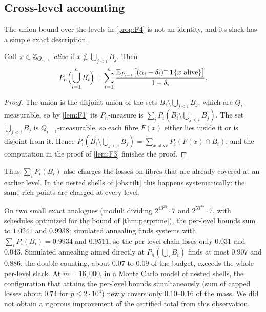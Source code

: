 \subsection{Cross-level accounting}

The union bound over the levels in \cref{prop:F4} is not an identity, and its slack has a simple exact description.

\begin{proposition}\label{prop:live}
Call $x\in\mathbb{Z}_{Q_{i-1}}$ \emph{alive} if $x\notin\bigcup_{j<i}B_j$. Then
\[
  P_n\Bigl(\bigcup_{i=1}^nB_i\Bigr)=\sum_{i=1}^n\frac{\mathbb{E}_{P_{i-1}}\bigl[(\alpha_i-\delta_i)^+\,\mathbf{1}\{x\text{ alive}\}\bigr]}{1-\delta_i}.
\]
\end{proposition}

\begin{proof}
The union is the disjoint union of the sets $B_i\setminus\bigcup_{j<i}B_j$, which are $Q_i$-measurable, so by
\cref{lem:F1} its $P_n$-measure is $\sum_iP_i(B_i\setminus\bigcup_{j<i}B_j)$. The set $\bigcup_{j<i}B_j$ is
$Q_{i-1}$-measurable, so each fibre $F(x)$ either lies inside it or is disjoint from it. Hence
$P_i(B_i\setminus\bigcup_{j<i}B_j)=\sum_{x\text{ alive}}P_i(F(x)\cap B_i)$, and the computation in the proof of
\cref{lem:F3} finishes the proof.
\end{proof}

Thus $\sum_iP_i(B_i)$ also charges the losses on fibres that are already covered at an earlier level. In the nested
shells of \cref{obs:tilt} this happens systematically: the same rich points are charged at every level.

\begin{observation}\label{obs:double}
On two small exact analogues (moduli dividing $2^43^25\cdot7$ and $2^53^35\cdot7$, with schedules optimized for the
bound of \cref{thm:perprime}), the per-level bounds sum to $1.0241$ and $0.9938$; simulated annealing finds systems
with $\sum_iP_i(B_i)=0.9934$ and $0.9511$, so the per-level chain loses only $0.031$ and $0.043$. Simulated annealing aimed
directly at $P_n(\bigcup_iB_i)$ finds at most $0.907$ and $0.886$: the double counting, about $0.07$ to $0.09$ of the budget, exceeds the
whole per-level slack. At $m=16{,}000$, in a Monte Carlo model of nested shells, the configuration that attains the
per-level bounds simultaneously (sum of capped losses about $0.74$ for $p\le2\cdot10^4$) newly covers only
$0.10$--$0.16$ of the mass. We did not obtain a rigorous improvement of the certified total from this observation.
\end{observation}

